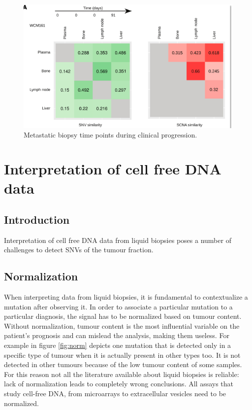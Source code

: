         \begin{figure}[H]
        \centering
            \includegraphics[width=0.7\linewidth]{time.png}
            \caption{Metastatic biopsy time points during clinical progression.}
        \label{fig:challenges}
        \end{figure}

\section{Interpretation of cell free DNA data}

    \subsection{Introduction}
    Interpretation of cell free DNA data from liquid biopsies poses a number of challenges to detect SNVs of the tumour fraction.

    \subsection{Normalization}
    When interpreting data from liquid biopsies, it is fundamental to contextualize a mutation after observing it.
    In order to associate a particular mutation to a particular diagnosis, the signal has to be normalized based on tumour content.
    Without normalization, tumour content is the most influential variable on the patient's prognosis and can mislead the analysis, making them useless.
    For example in figure \ref{fig:norm} depicts one mutation that is detected only in a specific type of tumour when it is actually present in other types too.
    It is not detected in other tumours because of the low tumour content of some samples.
    For this reason not all the literature available about liquid biopsies is reliable: lack of normalization leads to completely wrong conclusions.
    All assays that study cell-free DNA, from microarrays to extracellular vesicles need to be normalized.

